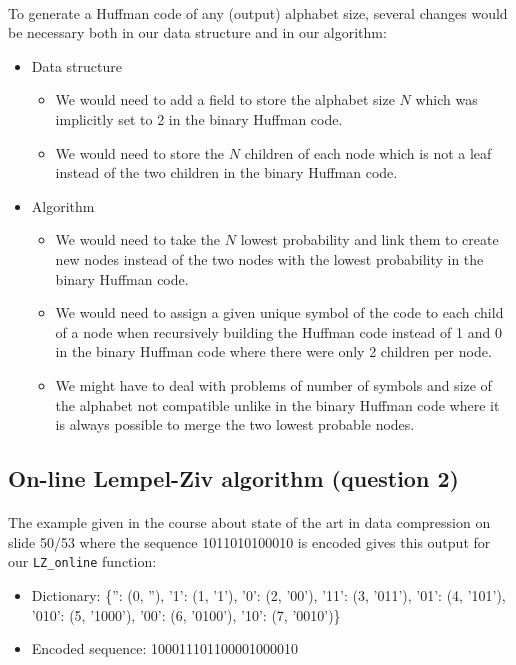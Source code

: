 \documentclass[a4paper, 11pt, oneside]{article}
\begin{document}
\paragraph{}To generate a Huffman code of any (output) alphabet size, several changes would be necessary both in our data structure and in our algorithm:
\begin{itemize}
    \item Data structure
        \begin{itemize}
            \item We would need to add a field to store the alphabet size $N$ which was implicitly set to 2 in the binary Huffman code.
            \item We would need to store the $N$ children of each node which is not a leaf instead of the two children in the binary Huffman code.
        \end{itemize}
    \item Algorithm
        \begin{itemize}
            \item We would need to take the $N$ lowest probability and link them to create new nodes instead of the two nodes with the lowest probability in the binary Huffman code.
            \item We would need to assign a given unique symbol of the code to each child of a node when recursively building the Huffman code instead of 1 and 0 in the binary Huffman code where there were only 2 children per node.
            \item We might have to deal with problems of number of symbols and size of the alphabet not compatible unlike in the binary Huffman code where it is always possible to merge the two lowest probable nodes. 
        \end{itemize}
\end{itemize}

\subsection{On-line Lempel-Ziv algorithm (question 2)}

\paragraph{}The example given in the course about state of the art in data compression on slide 50/53 where the sequence 1011010100010 is encoded gives this output for our \texttt{LZ\_online} function:
\begin{itemize}
    \item Dictionary: \{'': (0, ''), '1': (1, '1'), '0': (2, '00'), '11': (3, '011'), '01': (4, '101'), '010': (5, '1000'), '00': (6, '0100'), '10': (7, '0010')\}
    \item Encoded sequence: 100011101100001000010
\end{itemize}
\end{document}
